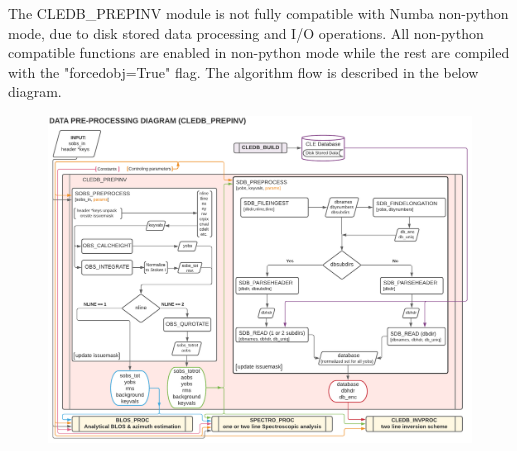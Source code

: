 \documentclass{article}
\begin{document}
The CLEDB\_PREPINV module is not fully compatible with Numba non-python mode, due to disk stored data processing and I/O operations. All non-python compatible functions are enabled in non-python mode while the rest are compiled with the "forcedobj=True" flag. The algorithm flow is described in the below diagram.


\begin{figure}[!p]
\vspace{-1cm}\hspace{-1cm}\includegraphics[angle=-90,width=1.12\columnwidth]{figs/3_CLEDB_PREP.pdf}
\end{figure} 

\newpage
\end{document}
